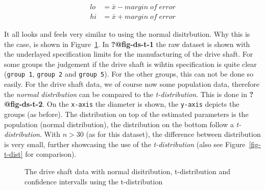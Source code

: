 \documentclass[
  a4paper,
]{scrbook}
\begin{document}
\begin{align}
lo &= \bar{x} - margin\;of\;error \label{cilobound} \\
hi &= \bar{x} + margin\;of\;error \label{cihibound}
\end{align}

It all looks and feels very similar to using the normal disitrbution.
Why this is the case, is shown in Figure~\ref{fig-ds-t}. In
\textbf{?@fig-ds-t-1} the raw dataset is shown with the underlayed
specification limits for the manufacturing of the drive shaft. For some
groups the judgement if the drive shaft is wihtin specification is quite
clear (\texttt{group\ 1}, \texttt{group\ 2} and \texttt{group\ 5}). For
the other groups, this can not be done so easily. For the drive shaft
data, we of course now some population data, therefore the \emph{normal
distribution} can be compared to the \emph{t-distribution}. This is done
in \textbf{?@fig-ds-t-2}. On the \texttt{x-axis} the diameter is shown,
the \texttt{y-axis} depicts the groups (as before). The distribution on
top of the estimated parameters is the population (normal distribution),
the distribution on the bottom follow a \emph{t-distribution}. With
\(n>30\) (as for this dataset), the difference between distribution is
very small, further showcasing the use of the \emph{t-distribution}
(also see Figure~\ref{fig-t-dist} for comparison).

\begin{figure}[ht]


\caption{\label{fig-ds-t}The drive shaft data with normal disitribution,
t-distribution and confidence intervalls using the t-distribution}

\end{figure}%
\end{document}
